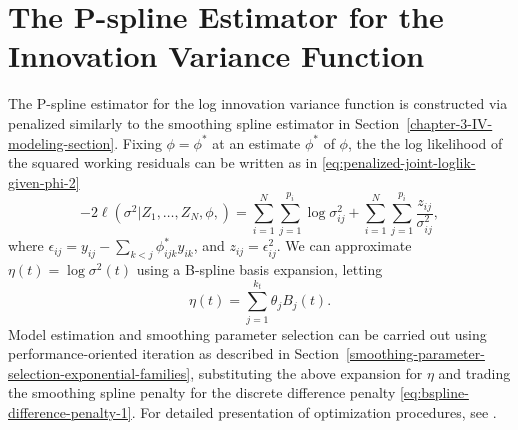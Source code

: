 \section{The P-spline Estimator for the Innovation Variance Function}

The P-spline estimator for the log innovation variance function is constructed via penalized similarly to the smoothing spline estimator in Section~\ref{chapter-3-IV-modeling-section}.  Fixing $\phi = \phi^*$ at an estimate $\phi^*$ of $\phi$, the the log likelihood of the squared working residuals can be written as in \eqref{eq:penalized-joint-loglik-given-phi-2}
\[
-2\ell\left( \sigma^2  \vert Z_1,\dots, Z_N, \phi,  \right) =  \sum_{i = 1}^N \sum_{j = 1}^{p_i} \log \sigma^2_{ij}  + \sum_{i = 1}^N \sum_{j = 1}^{p_i} \frac {z_{ij}}{\sigma^2_{ij}},
\]
\noindent
where $\epsilon_{ij} =  y_{ij} - \sum\limits_{k<j} \phi^*_{ijk} y_{ik}$, and $z_{ij} = \epsilon_{ij}^2$. We can approximate $\eta \left(t\right) = \log \sigma^2\left(t\right)$ using a B-spline basis expansion, letting
\[
\eta\left(t\right) = \sum\limits_{j = 1}^{k_t} \theta_j B_{j}\left(t\right).
\] 
\noindent
Model estimation and smoothing parameter selection can be carried out using performance-oriented iteration as described in Section~\ref{smoothing-parameter-selection-exponential-families}, substituting the above expansion for $\eta$ and trading the smoothing spline penalty for the discrete difference penalty \eqref{eq:bspline-difference-penalty-1}. For detailed presentation of optimization procedures, see \cite{marx1999generalized}. 

